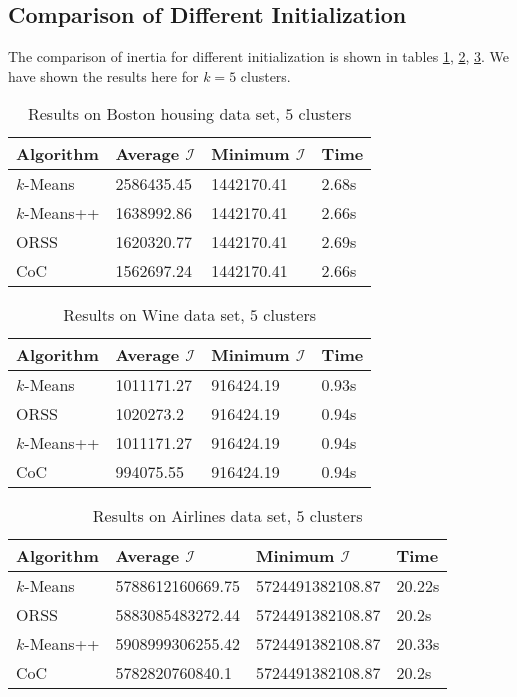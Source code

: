 \documentclass[twoside, 11pt]{article}
\newcommand{\I}{\mathcal{I}}
\begin{document}
	\subsection{Comparison of Different Initialization}
	The comparison of inertia for different initialization is shown in tables \ref{tbl:boston}, \ref{tbl:wine}, \ref{tbl:airlines}. We have shown the results here for $k=5$ clusters.
		\begin{table}
			\begin{center}
				\begin{tabular}{|l|l|l|l|}
					\hline
					Algorithm & Average $\I$& Minimum $\I$& Time\\\hline
					$k$-Means & 2586435.45& 1442170.41& 2.68s\\\hline
					$k$-Means++ & 1638992.86& 1442170.41& 2.66s\\\hline
					ORSS & 1620320.77& 1442170.41& 2.69s\\\hline
					CoC & 1562697.24& 1442170.41& 2.66s\\\hline
				\end{tabular}
			\caption{Results on Boston housing data set, $5$ clusters}
			\label{tbl:boston}
			\end{center}
		\end{table}
	
		\begin{table}
			\begin{center}
				\begin{tabular}{|l|l|l|l|}
					\hline
					Algorithm & Average $\I$& Minimum $\I$& Time\\\hline
					$k$-Means & 1011171.27& 916424.19& 0.93s\\\hline
					ORSS & 1020273.2& 916424.19& 0.94s\\\hline
					$k$-Means++ & 1011171.27& 916424.19& 0.94s\\\hline
					CoC & 994075.55& 916424.19& 0.94s\\\hline
				\end{tabular}
				\caption{Results on Wine data set, $5$ clusters}
				\label{tbl:wine}
			\end{center}
			
		\end{table}

		\begin{table}
			\begin{center}
				\begin{tabular}{|l|l|l|l|}
					\hline
					Algorithm & Average $\I$& Minimum $\I$& Time\\\hline
					$k$-Means & 5788612160669.75& 5724491382108.87& 20.22s\\\hline
					ORSS & 5883085483272.44& 5724491382108.87& 20.2s\\\hline
					$k$-Means++ & 5908999306255.42& 5724491382108.87& 20.33s\\\hline
					CoC & 5782820760840.1& 5724491382108.87& 20.2s\\\hline
				\end{tabular}
				\caption{Results on Airlines data set, $5$ clusters}
				\label{tbl:airlines}
			\end{center}
			
		\end{table}
\end{document}
